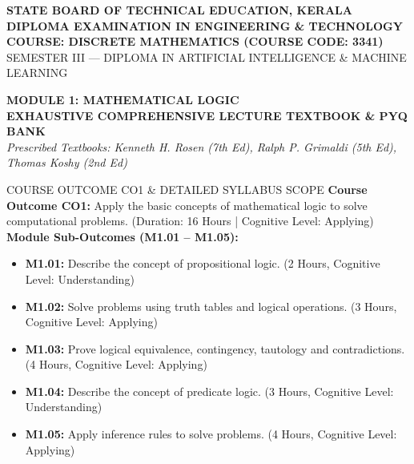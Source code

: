 \documentclass[11pt,a4paper]{article}
\begin{document}
\thispagestyle{empty}

\begin{center}
    \begin{tcolorbox}[halign=center]
        \color{white}
        {\large \textbf{STATE BOARD OF TECHNICAL EDUCATION, KERALA}}\\[4pt]
        {\Large \textbf{DIPLOMA EXAMINATION IN ENGINEERING \& TECHNOLOGY}}\\[4pt]
        {\large \textbf{COURSE: DISCRETE MATHEMATICS (COURSE CODE: 3341)}}\\[2pt]
        {\small SEMESTER III --- DIPLOMA IN ARTIFICIAL INTELLIGENCE \& MACHINE LEARNING}
    \end{tcolorbox}
\end{center}

\vspace{15pt}

\begin{center}
    {\huge \textbf{\textcolor{primaryblue}{MODULE 1: MATHEMATICAL LOGIC}}}\\[8pt]
    {\Large \textbf{\textcolor{secondaryteal}{EXHAUSTIVE COMPREHENSIVE LECTURE TEXTBOOK \& PYQ BANK}}}\\[6pt]
    \textit{Prescribed Textbooks: Kenneth H. Rosen (7th Ed), Ralph P. Grimaldi (5th Ed), Thomas Koshy (2nd Ed)}
\end{center}

\vspace{15pt}

\begin{lecturnote}{COURSE OUTCOME CO1 \& DETAILED SYLLABUS SCOPE}
\textbf{Course Outcome CO1:} Apply the basic concepts of mathematical logic to solve computational problems. (Duration: 16 Hours | Cognitive Level: Applying)\\[6pt]
\textbf{Module Sub-Outcomes (M1.01 -- M1.05):}
\begin{itemize}[leftmargin=1.5em, itemsep=3pt]
    \item \textbf{M1.01:} Describe the concept of propositional logic. (2 Hours, Cognitive Level: Understanding)
    \item \textbf{M1.02:} Solve problems using truth tables and logical operations. (3 Hours, Cognitive Level: Applying)
    \item \textbf{M1.03:} Prove logical equivalence, contingency, tautology and contradictions. (4 Hours, Cognitive Level: Applying)
    \item \textbf{M1.04:} Describe the concept of predicate logic. (3 Hours, Cognitive Level: Understanding)
    \item \textbf{M1.05:} Apply inference rules to solve problems. (4 Hours, Cognitive Level: Applying)
\end{itemize}
\end{lecturnote}
\end{document}
